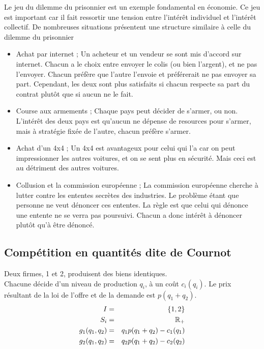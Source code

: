 Le jeu du dilemme du prisonnier est un exemple fondamental en
économie. Ce jeu est important car il fait ressortir une tension
entre l'intérêt individuel et l'intérêt collectif. De nombreuses
situations présentent une structure similaire à celle du dilemme
du prisonnier
\begin{itemize}
\item Achat par internet ; Un acheteur et un vendeur se sont mis
d'accord sur internet. Chacun a le choix entre envoyer le colis
(ou bien l'argent), et ne pas l'envoyer. Chacun préfère que
l'autre l'envoie et préférerait ne pas envoyer sa part. Cependant,
les deux sont plus satisfaits si chacun respecte sa
part du contrat plutôt que si aucun ne le fait.%
\item Course aux armements ; Chaque pays peut décider de s'armer,
ou non. L'intérêt des deux pays est qu'aucun ne dépense de
resources pour s'armer, mais à stratégie fixée de l'autre, chacun
préfère s'armer.%
\item Achat d'un 4x4 ; Un 4x4 est avantageux pour celui qui l'a car on peut impressionner
les autres voitures, et on se sent plus en sécurité. Mais ceci est au détriment des autres voitures. %
\item Collusion et la commission européenne ; La commission
européenne cherche à lutter contre les ententes secrètes des
industries. Le problème étant que personne ne veut dénoncer ces
ententes. La règle est que celui qui dénonce une entente ne se
verra pas poursuivi. Chacun a donc intérêt à dénoncer plutôt qu'à
être dénoncé.
\end{itemize}


\subsection{Compétition en quantités dite de Cournot}
Deux firmes, 1 et 2, produisent des biens identiques.\\
Chacune décide d'un niveau de production $q_i$, à un co\^ut
$c_i(q_i)$. Le prix résultant de la loi de l'offre et de la
demande est $p(q_1+q_2)$.
\begin{eqnarray*}
I   &=& \{1,2\}\\
S_i &=& \mathbb R_+ \\
g_1(q_1,q_2) &=& q_1 p(q_1+q_2)-c_1(q_1)\\
g_2(q_1,q_2) &=& q_2 p(q_1+q_2)-c_2(q_2)
\end{eqnarray*}

